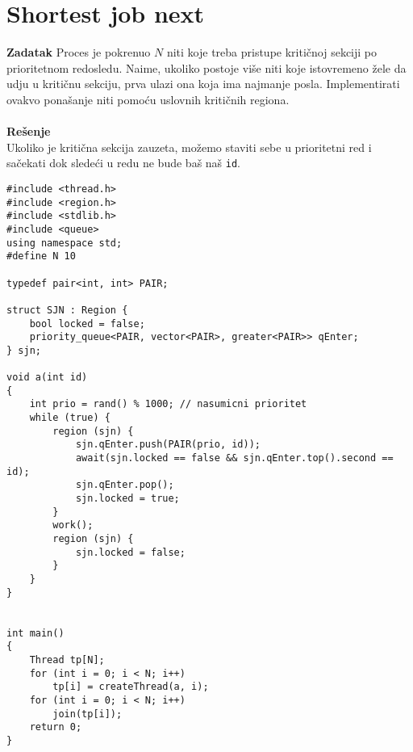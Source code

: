 \clearpage
\section{\latin Shortest job next}
\textbf{\large Zadatak} Proces je pokrenuo $N$ niti koje treba pristupe kriti\v{c}noj sekciji po prioritetnom redosledu. Naime, ukoliko postoje vi\v{s}e niti koje istovremeno \v{z}ele da udju u kriti\v{c}nu sekciju, prva ulazi ona koja ima najmanje posla. Implementirati ovakvo pona\v{s}anje niti pomo\'{c}u uslovnih kriti\v{c}nih regiona.
\\\\
\textbf{\large Re\v{s}enje}\\
Ukoliko je kriti\v{c}na sekcija zauzeta, mo\v{z}emo staviti sebe u prioritetni red i sa\v{c}ekati dok slede\'{c}i u redu ne bude ba\v{s} na\v{s} \texttt{id}.
\begin{lstlisting}
#include <thread.h>
#include <region.h>
#include <stdlib.h>
#include <queue>
using namespace std;
#define N 10

typedef pair<int, int> PAIR;

struct SJN : Region {
    bool locked = false;
    priority_queue<PAIR, vector<PAIR>, greater<PAIR>> qEnter;
} sjn;

void a(int id) 
{
    int prio = rand() % 1000; // nasumicni prioritet
    while (true) {
        region (sjn) {
            sjn.qEnter.push(PAIR(prio, id));
            await(sjn.locked == false && sjn.qEnter.top().second == id);
            sjn.qEnter.pop();
            sjn.locked = true;
        }
        work();
        region (sjn) {
            sjn.locked = false;
        }
    }
}


int main() 
{
    Thread tp[N];
    for (int i = 0; i < N; i++) 
        tp[i] = createThread(a, i);
    for (int i = 0; i < N; i++) 
        join(tp[i]);
    return 0;
}

\end{lstlisting}